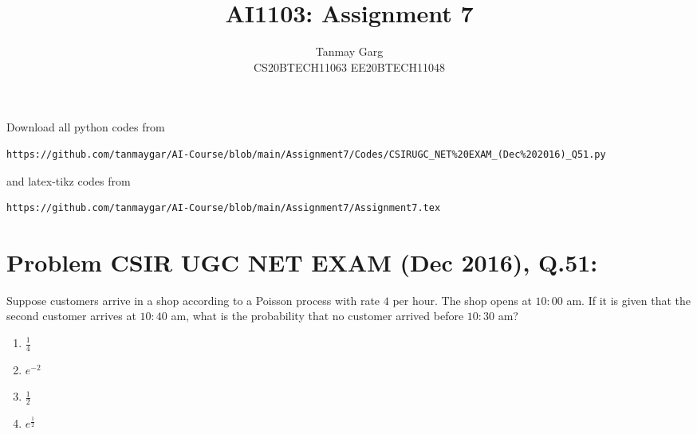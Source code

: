 \documentclass[journal,12pt,twocolumn]{IEEEtran}
\begin{document}
     \def\rightbox#1{\makebox[0in][r]{#1}}
     \def\centbox#1{\makebox[0in]{#1}}
     \def\topbox#1{\raisebox{-\baselineskip}[0in][0in]{#1}}
     \def\midbox#1{\raisebox{-0.5\baselineskip}[0in][0in]{#1}}
\vspace{3cm}
\title{AI1103: Assignment 7}
\author{Tanmay Garg \\CS20BTECH11063 EE20BTECH11048}
\maketitle
\newpage
\bigskip
\renewcommand{\thefigure}{\theenumi}
\renewcommand{\thetable}{\theenumi}
Download all python codes from 
\begin{lstlisting}
https://github.com/tanmaygar/AI-Course/blob/main/Assignment7/Codes/CSIRUGC_NET%20EXAM_(Dec%202016)_Q51.py
\end{lstlisting}
%
and latex-tikz codes from 
%
\begin{lstlisting}
https://github.com/tanmaygar/AI-Course/blob/main/Assignment7/Assignment7.tex
\end{lstlisting}
\section*{Problem CSIR UGC NET EXAM (Dec 2016), Q.51: }
Suppose customers arrive in a shop according to a Poisson process with rate $4$ per hour. The shop opens at $10:00$ am. If it is given that the second customer arrives at $10:40 $ am, what is the probability that no customer arrived before $10:30 $ am? 
\begin{multicols}{4}
    \begin{enumerate}
        \item $\frac{1}{4}$
        \item $e^{-2}$
        \item $\frac{1}{2}$
        \item $e^{\frac{1}{2}}$
    \end{enumerate}
\end{multicols}
\end{document}
